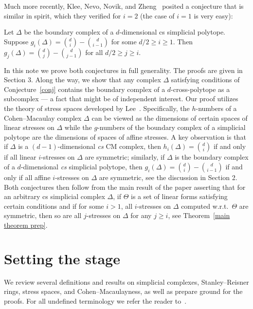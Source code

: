 Much more recently, Klee, Nevo, Novik, and Zheng~\cite[Conjecture 8.5]{KNNZ} posited a conjecture that is similar in spirit, which they verified for $i=2$ (the case of $i=1$ is very easy):
 \begin{conjecture}\label{conj2}
	Let $\Delta$ be the boundary complex of a $d$-dimensional cs simplicial polytope. Suppose $g_i(\Delta)=\binom{d}{i}-\binom{d}{i-1}$ for some $d/2\geq i\geq 1$. Then $g_j(\Delta)=\binom{d}{j}-\binom{d}{j-1}$ for all $d/2\geq j\geq i$.
\end{conjecture}

In this note we prove both conjectures in full generality. The proofs are given in Section 3. Along the way, we show that any complex $\Delta$ satisfying conditions of Conjecture~\ref{conj} contains the boundary complex of a $d$-cross-polytope as a subcomplex --- a fact that might be of independent interest. Our proof utilizes the theory of stress spaces developed by Lee~\cite{Lee96}. Specifically, the $h$-numbers of a Cohen--Macaulay complex $\Delta$ can be viewed as the dimensions of certain spaces of linear stresses on $\Delta$ while the $g$-numbers of the boundary complex of a simplicial polytope are the dimensions of spaces of affine stresses. A key observation is that if $\Delta$ is a $(d-1)$-dimensional \emph{cs} CM complex, then $h_i(\Delta)=\binom{d}{i}$ if and only if all linear $i$-stresses on $\Delta$ are symmetric; similarly, if $\Delta$ is the boundary complex of a $d$-dimensional \emph{cs} simplicial polytope, then $g_i(\Delta)=\binom{d}{i}-\binom{d}{i-1}$ if and only if all affine $i$-stresses on $\Delta$ are symmetric, see the discussion in Section 2. Both conjectures then follow from the main result of the paper asserting that for an arbitrary cs simplicial complex $\Delta$, if $\Theta$ is a set of linear forms satisfying certain conditions and if for some $i>1$, all $i$-stresses on $\Delta$ computed w.r.t.~$\Theta$ are symmetric, then so are all $j$-stresses on $\Delta$ for any $j\geq i$, see Theorem~\ref{main theorem prep}.



\section{Setting the stage}
We review several definitions and results on simplicial complexes, Stanley--Reisner rings, stress spaces, and Cohen--Macaulayness, as well as prepare ground for the proofs. For all undefined terminology we refer the reader to~\cite{Lee96, Stanley96}.

